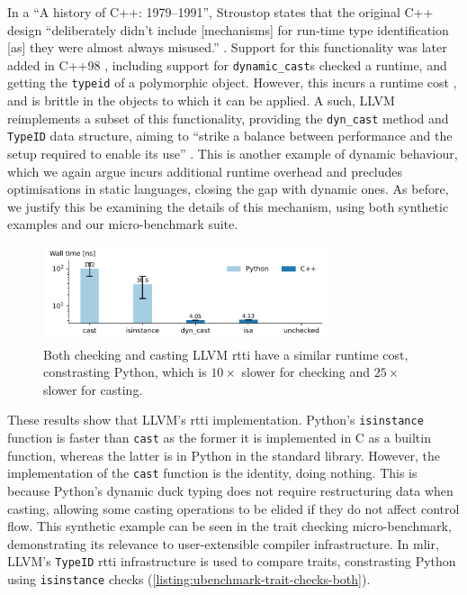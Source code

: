 In a ``A history of C++: 1979--1991'', Stroustop states that the original C++ design ``deliberately didn't include [mechanisms] for run-time type identification [as] they were almost always misused.'' \cite{stroustrupHistory197919911996}.
Support for this functionality was later added in C++98 \cite{internationalorganizationforstandardizationISOIEC148821998}, including support for \texttt{dynamic\_cast}s checked a runtime, and getting the \texttt{typeid} of a polymorphic object. However, this incurs a runtime cost \cite{goldthwaite2006technical}, and is brittle in the objects to which it can be applied. A such, LLVM reimplements a subset of this functionality, providing the \texttt{dyn\_cast} method and \texttt{TypeID} data structure, aiming to ``strike a balance between performance and the setup required to enable its use'' \cite{mlirteamMLIRCodeDocumentation}.
This is another example of dynamic behaviour, which we again argue incurs additional runtime overhead and precludes optimisations in static languages, closing the gap with dynamic ones.
As before, we justify this be examining the details of this mechanism, using both synthetic examples and our micro-benchmark suite.

\begin{figure}[H]
    \centering
    \includegraphics[width=0.75\textwidth]{images/impact_dynamism/dynamic_cast.pdf}
    \caption{Both checking and casting LLVM \ac{rtti} have a similar runtime cost, constrasting Python, which is $10\times$ slower for checking and $25\times$ slower for casting.}
    \label{figure:impact-rtti}
\end{figure}

These results show that LLVM's \ac{rtti} implementation.
Python's \texttt{isinstance} function is faster than \texttt{cast} as the former it is implemented in C as a builtin function, whereas the latter is in Python in the standard library.
However, the implementation of the \texttt{cast} function is the identity, doing nothing. This is because Python's dynamic duck typing \cite{milojkovicItsDuckTyping2017} does not require restructuring data when casting, allowing some casting operations to be elided if they do not affect control flow.
This synthetic example can be seen in the trait checking micro-benchmark, demonstrating its relevance to user-extensible compiler infrastructure. In \ac{mlir}, LLVM's \texttt{TypeID} \ac{rtti} infrastructure is used to compare traits, constrasting Python using \texttt{isinstance} checks (\autoref{listing:ubenchmark-trait-checks-both}).




